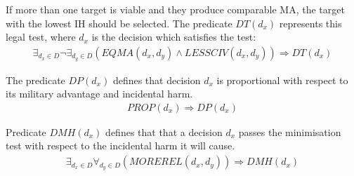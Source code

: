 


\begin{ddefinition}
\label{formula:dt}
If more than one target is viable and they produce comparable MA, the target with the lowest IH should be selected. The predicate $DT(d_x)$ represents this legal test, where $d_x$ is the decision which satisfies the test:
\begin{align*}
\exists_{d_x \in D} \neg \exists_{d_y \in D}(EQMA(d_x,d_y) \wedge LESSCIV(d_x,d_y)) \nonumber  \Rightarrow DT(d_x)
\end{align*}
\end{ddefinition}  

\begin{ddefinition}
\label{formula:dp}
The predicate $DP(d_x)$ defines that decision $d_x$ is proportional with respect to its military advantage and incidental harm.
\begin{align*}
PROP(d_x) \Rightarrow DP(d_x)
\end{align*}
\end{ddefinition}


\begin{ddefinition}
\label{formula:dmh}
Predicate $DMH(d_x)$ defines that that a decision $d_x$ passes the minimisation test with respect to the incidental harm it will cause.
\begin{align*}
\exists_{d_x \in D}\forall_{d_y \in D} (MOREREL(d_x,d_y)) \Rightarrow  DMH(d_x)
\end{align*}
\end{ddefinition}

